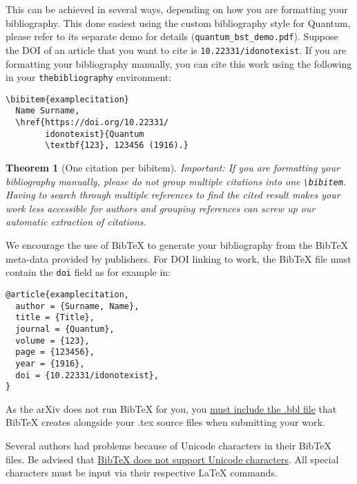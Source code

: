 \documentclass[a4paper,twocolumn,11pt,accepted=2017-05-09]{quantumarticle}
\newtheorem{theorem}{Theorem}
\begin{document}
This can be achieved in several ways, depending on how you are formatting your bibliography.
This done easiest using the custom bibliography style for Quantum,
please refer to its separate demo for details (\texttt{quantum\_bst\_demo.pdf}).
Suppose the DOI of an article \cite{examplecitation} that you want to cite is \texttt{10.22331/idonotexist}.
If you are formatting your bibliography manually, you can cite this work using the following in your \texttt{thebibliography} environment:
\begin{verbatim}
\bibitem{examplecitation}
  Name Surname,
  \href{https://doi.org/10.22331/
        idonotexist}{Quantum
        \textbf{123}, 123456 (1916).}
\end{verbatim}

\begin{theorem}[One citation per bibitem]
  Important: If you are formatting your bibliography manually, please do not group multiple citations into one \texttt{\textbackslash{}bibitem}.
  Having to search through multiple references to find the cited result makes your work less accessible for authors and grouping references can screw up our automatic extraction of citations.
\end{theorem}

We encourage the use of BibTeX to generate your bibliography from the BibTeX meta-data provided by publishers.
For DOI linking to work, the BibTeX file must contain the \texttt{doi} field as for example in:
\begin{verbatim}
@article{examplecitation,
  author = {Surname, Name},
  title = {Title},
  journal = {Quantum},
  volume = {123},
  page = {123456},
  year = {1916},
  doi = {10.22331/idonotexist},
}
\end{verbatim}
As the arXiv does not run BibTeX for you, you \href{https://arxiv.org/help/submit_tex}{must include the .bbl file} that BibTeX creates alongside your .tex source files when submitting your work.

Several authors had problems because of Unicode characters in their BibTeX files.
Be advised that \href{http://wiki.lyx.org/BibTeX/Tips}{BibTeX does not support Unicode characters}.
All special characters must be input via their respective LaTeX commands.
\end{document}
